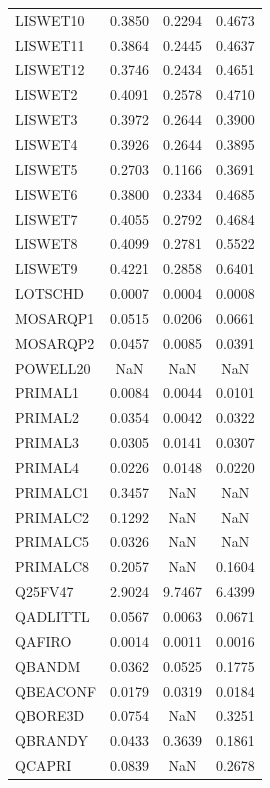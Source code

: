 \begin{longtable}{lccc}
LISWET10 &   0.3850 &   0.2294 &   0.4673 \\
LISWET11 &   0.3864 &   0.2445 &   0.4637 \\
LISWET12 &   0.3746 &   0.2434 &   0.4651 \\
LISWET2  &   0.4091 &   0.2578 &   0.4710 \\
LISWET3  &   0.3972 &   0.2644 &   0.3900 \\
LISWET4  &   0.3926 &   0.2644 &   0.3895 \\
LISWET5  &   0.2703 &   0.1166 &   0.3691 \\
LISWET6  &   0.3800 &   0.2334 &   0.4685 \\
LISWET7  &   0.4055 &   0.2792 &   0.4684 \\
LISWET8  &   0.4099 &   0.2781 &   0.5522 \\
LISWET9  &   0.4221 &   0.2858 &   0.6401 \\
LOTSCHD  &   0.0007 &   0.0004 &   0.0008 \\
MOSARQP1 &   0.0515 &   0.0206 &   0.0661 \\
MOSARQP2 &   0.0457 &   0.0085 &   0.0391 \\
POWELL20 &      NaN &      NaN &      NaN \\
PRIMAL1  &   0.0084 &   0.0044 &   0.0101 \\
PRIMAL2  &   0.0354 &   0.0042 &   0.0322 \\
PRIMAL3  &   0.0305 &   0.0141 &   0.0307 \\
PRIMAL4  &   0.0226 &   0.0148 &   0.0220 \\
PRIMALC1 &   0.3457 &      NaN &      NaN \\
PRIMALC2 &   0.1292 &      NaN &      NaN \\
PRIMALC5 &   0.0326 &      NaN &      NaN \\
PRIMALC8 &   0.2057 &      NaN &   0.1604 \\
Q25FV47  &   2.9024 &   9.7467 &   6.4399 \\
QADLITTL &   0.0567 &   0.0063 &   0.0671 \\
QAFIRO   &   0.0014 &   0.0011 &   0.0016 \\
QBANDM   &   0.0362 &   0.0525 &   0.1775 \\
QBEACONF &   0.0179 &   0.0319 &   0.0184 \\
QBORE3D  &   0.0754 &      NaN &   0.3251 \\
QBRANDY  &   0.0433 &   0.3639 &   0.1861 \\
QCAPRI   &   0.0839 &      NaN &   0.2678 \\

\end{longtable}
